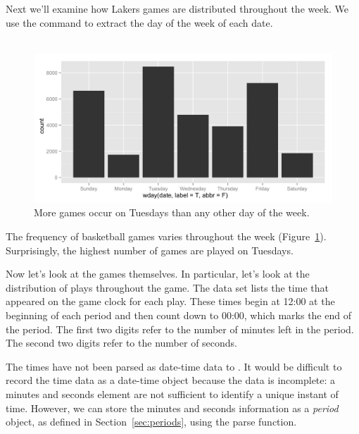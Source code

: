 \documentclass[article]{jss}
\begin{document}
Next we'll examine how Lakers games are distributed throughout the week. We use the  command to extract the day of the week of each date.\\

\\

\begin{figure}[htpb]
  \centering    
    \includegraphics[width=\textwidth]{weekdays-histogram.png}     
  \caption{More games occur on Tuesdays than any other day of the week.}
  \label{fig:games-days}
\end{figure}


The frequency of basketball games varies throughout the week (Figure~\ref{fig:games-days}). Surprisingly, the highest number of games are played on Tuesdays.

Now let's look at the games themselves. In particular, let's look at the distribution of plays throughout the game. The  data set lists the time that appeared on the game clock for each play. These times begin at 12:00 at the beginning of each period and then count down to 00:00, which marks the end of the period. The first two digits refer to the number of minutes left in the period. The second two digits refer to the number of seconds.

The times have not been parsed as date-time data to . It would be difficult to record the time data as a date-time object because the data is incomplete: a minutes and seconds element are not sufficient to identify a unique instant of time. However, we can store the minutes and seconds information as a \emph{period} object, as defined in Section~\ref{sec:periods}, using the  parse function.\\

\\
\end{document}
